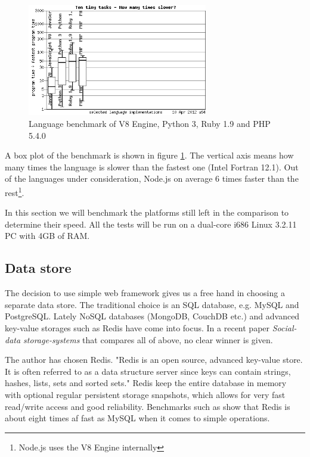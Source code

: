 \documentclass[12pt,oneside]{fithesis}
\begin{document}
		\begin{figure}[htb]
	  \centering
	    \includegraphics[width=0.7\textwidth]{bench2.png}
		  \caption{Language benchmark of V8 Engine, Python 3, Ruby 1.9 and PHP 5.4.0}
		  \label{fig:bench1}
		\end{figure}
		
		A box plot of the benchmark is shown in figure \ref{fig:bench1}. The vertical axis means how many times the language is slower than the fastest one (Intel Fortran 12.1). Out of the languages under consideration, Node.js on average 6 times faster than the rest\footnote{Node.js uses the V8 Engine internally}. 
		
		In this section we will benchmark the platforms still left in the comparison to determine their speed. All the tests will be run on a dual-core i686 Linux 3.2.11 PC with 4GB of RAM.
	
	
	\subsection{Data store}		
		The decision to use simple web framework gives us a free hand in choosing a separate data store. The traditional choice is an SQL database, e.g. MySQL and PostgreSQL. Lately NoSQL databases (MongoDB, CouchDB etc.) and  advanced key-value storages such as Redis have come into focus. In a recent paper \emph{Social-data storage-systems} \cite{Ruflin2011} that compares all of above, no clear winner is given.
		
		The author has chosen Redis. "Redis is an open source, advanced key-value store. It is often referred to as a data structure server since keys can contain strings, hashes, lists, sets and sorted sets."\cite{website:redis} Redis keep the entire database in memory with optional regular persistent storage snapshots, which allows for very fast read/write access and good reliability.	Benchmarks such as \cite{website:ruturaj} show that Redis is about eight times af fast as MySQL when it comes to simple operations.
		
\end{document}
